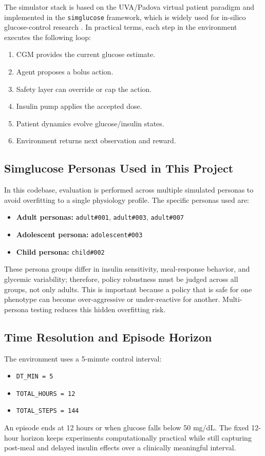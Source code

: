 \documentclass[conference]{IEEEtran}
\begin{document}
The simulator stack is based on the UVA/Padova virtual patient paradigm and implemented in the \texttt{simglucose} framework, which is widely used for in-silico glucose-control research \cite{simglucose_repo,simglucose_2018,uva_padova}. In practical terms, each step in the environment executes the following loop:
\begin{enumerate}
    \item CGM provides the current glucose estimate.
    \item Agent proposes a bolus action.
    \item Safety layer can override or cap the action.
    \item Insulin pump applies the accepted dose.
    \item Patient dynamics evolve glucose/insulin states.
    \item Environment returns next observation and reward.
\end{enumerate}

\subsection{Simglucose Personas Used in This Project}
In this codebase, evaluation is performed across multiple simulated personas to avoid overfitting to a single physiology profile. The specific personas used are:
\begin{itemize}
    \item \textbf{Adult personas:} \texttt{adult\#001}, \texttt{adult\#003}, \texttt{adult\#007}
    \item \textbf{Adolescent persona:} \texttt{adolescent\#003}
    \item \textbf{Child persona:} \texttt{child\#002}
\end{itemize}

These persona groups differ in insulin sensitivity, meal-response behavior, and glycemic variability; therefore, policy robustness must be judged across all groups, not only adults.
This is important because a policy that is safe for one phenotype can become over-aggressive or under-reactive for another. Multi-persona testing reduces this hidden overfitting risk.

\subsection{Time Resolution and Episode Horizon}
The environment uses a 5-minute control interval:
\begin{itemize}
    \item \texttt{DT\_MIN = 5}
    \item \texttt{TOTAL\_HOURS = 12}
    \item \texttt{TOTAL\_STEPS = 144}
\end{itemize}
An episode ends at 12 hours or when glucose falls below 50 mg/dL.
The fixed 12-hour horizon keeps experiments computationally practical while still capturing post-meal and delayed insulin effects over a clinically meaningful interval.
\end{document}
